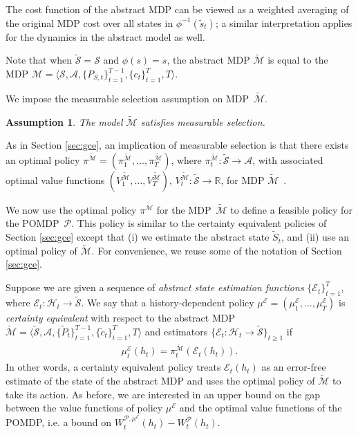 \documentclass[letterpaper, 10pt]{IEEEtran}
\theoremstyle{plain}
\theoremstyle{nonumberplain}
\theoremstyle{plain}
\newtheorem{assumption}{Assumption}
\newcommand*\ALPHABET{\mathcal}
\newcommand*\ABSTRACT{\tilde}
\newcommand*\reals{\mathds{R}}
\newcommand\EST{\mathcal{E}}
\begin{document}
The cost function of the abstract MDP can be viewed as a weighted averaging  of the original MDP cost over all states in $\phi^{-1}(\ABSTRACT s_t)$; a similar interpretation applies for the dynamics in the abstract model as well. 

Note that when $\ABSTRACT {\ALPHABET S} = \ALPHABET S$ and $\phi(s) = s$, the abstract MDP $\ABSTRACT{\ALPHABET M}$ is equal to the MDP $\ALPHABET M = \langle \ALPHABET S, \ALPHABET A, \{P_{S,t}\}_{t=1}^{T-1}, \{c_t\}_{t=1}^T, T \rangle$. 


We impose the measurable selection assumption on  MDP~$\ABSTRACT {\ALPHABET M}$.
\begin{assumption}\label{ass:meas-selection2}
    The model $\ABSTRACT {\ALPHABET M}$ satisfies measurable selection.
\end{assumption}

As in Section \ref{sec:gce}, an implication of measurable selection is that there exists an optimal policy $\pi^{\ABSTRACT {\ALPHABET M}} = (\pi^{\ABSTRACT {\ALPHABET M}}_1, \dots, \pi^{\ABSTRACT {\ALPHABET M}}_T)$, where $\pi^{\ABSTRACT {\ALPHABET M}}_t \colon \ABSTRACT {\ALPHABET S}  \to \ALPHABET A$, with associated optimal value functions $(V^{\ABSTRACT {\ALPHABET M}}_1, \dots, V^{\ABSTRACT {\ALPHABET M}}_T)$, $V^{\ABSTRACT {\ALPHABET M}}_t \colon \ABSTRACT {\ALPHABET S} \to \reals$, for MDP $\ABSTRACT{\ALPHABET M}$~\cite{hernandez2012discrete}. 

We now use the optimal policy $\pi^{\ABSTRACT {\ALPHABET M}}$ for the MDP~$\ABSTRACT {\ALPHABET M}$ to define a feasible policy for the POMDP~$\ALPHABET P$. This policy is similar to the certainty equivalent policies of Section \ref{sec:gce} except that (i) we estimate the abstract state $\ABSTRACT S_{t}$, and (ii) use an optimal policy of $\ABSTRACT {\ALPHABET M}$. For convenience, we reuse some of the notation of Section \ref{sec:gce}. 

Suppose we are given a sequence of \emph{abstract state estimation functions} $\{\EST_t\}_{t=1}^T$, where $\EST_t \colon \ALPHABET H_t \to \ABSTRACT {\ALPHABET S}$. 
We say that a history-dependent policy $\mu^\EST = (\mu^\EST_1, \dots, \mu^\EST_T)$ is \emph{ certainty equivalent} with respect to the abstract MDP $\ABSTRACT {\ALPHABET M} =\langle \ABSTRACT{\ALPHABET S}, \ALPHABET A, \{\tilde {P}_{t}\}_{t=1}^{T-1}, \{\tilde {c}_t\}_{t=1}^T, T\rangle$ and estimators  $\{\EST_t\colon \ALPHABET H_t \to \ABSTRACT {\ALPHABET S}\}_{t \ge 1}$ if 
\begin{align}\label{eq:cert_equiv2}
    \mu^\EST_t(h_t) = \pi^{\ABSTRACT {\ALPHABET M}}_t(\EST_t(h_t)).
\end{align}
In other words, a certainty equivalent policy treats   $\EST_t(h_t)$ as an error-free estimate of the state of the abstract MDP and uses the optimal policy of $\ABSTRACT {\ALPHABET M}$ to take its action.  As before, we are interested in an upper bound on the gap between the value functions of policy $\mu^\EST$ and the optimal value functions of the POMDP, i.e. a bound on  
 $W^{{\ALPHABET{P}},\mu^\EST}_t(h_t) - W^{\ALPHABET{P}}_t(h_t)$.
\end{document}
